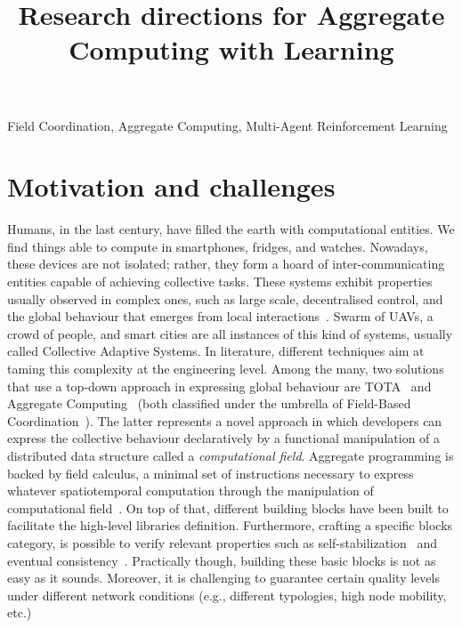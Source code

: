 \documentclass[conference]{IEEEtran}
\begin{document}
\title{Research directions for Aggregate Computing with Learning}

\author{
\and
{}
}

\maketitle

\begin{IEEEkeywords}
Field Coordination, Aggregate Computing, Multi-Agent Reinforcement Learning
\end{IEEEkeywords}

\section{Motivation and challenges}
Humans, in the last century, have filled the earth with computational entities. 
%
We find things able to compute in smartphones, fridges, and watches. %
Nowadays, these devices are not isolated; rather, they form a hoard of inter-communicating entities capable of achieving collective tasks. 
These systems exhibit properties usually observed in complex ones, such as large scale, 
decentralised control, and the global behaviour that emerges from local interactions~\cite{DBLP:conf/huc/Ferscha15}. 
Swarm of UAVs, a crowd of people, and smart cities are all instances of this kind of systems, usually called Collective Adaptive Systems.
%
In literature, different techniques aim at taming this complexity at the engineering level.
Among the many, two solutions that use a top-down approach in expressing global behaviour are TOTA~\cite{DBLP:journals/tosem/MameiZ09} and Aggregate Computing~\cite{DBLP:journals/computer/BealPV15} (both classified under the umbrella of Field-Based Coordination~\cite{DBLP:books/daglib/0015276}).
The latter represents a novel approach in which developers can express the collective behaviour declaratively by
a functional manipulation of a distributed data structure called a \emph{computational field}.
Aggregate programming is backed by field calculus, a minimal set of instructions necessary to express whatever spatiotemporal computation 
through the manipulation of computational field~\cite{DBLP:conf/coordination/AudritoBDV18}. 
On top of that, different building blocks have been built to facilitate the high-level libraries definition.
Furthermore, crafting a specific blocks category, is possible to verify relevant properties such as self-stabilization~\cite{DBLP:conf/coordination/ViroliD14} and eventual consistency~\cite{DBLP:conf/saso/BealVPD16}.
Practically though, building these basic blocks is not as easy as it sounds. 
Moreover, it is challenging to guarantee certain quality levels under different network conditions (e.g., different typologies, high node mobility, etc.)
\end{document}
